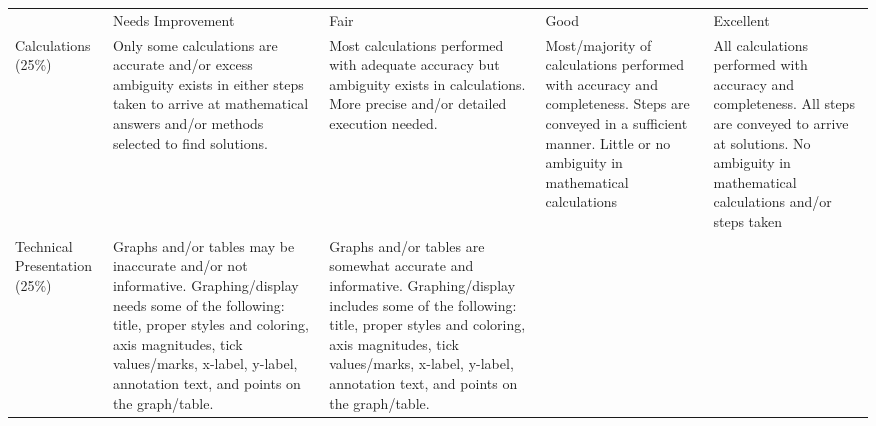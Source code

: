 \documentclass[letterpaper,12pt]{article}
\begin{document}

\begin{landscape}
\begin{footnotesize}
\renewcommand{\arraystretch}{2}
\nopagebreak[6]
	\vspace*{-20mm}
\begin{longtable}{| >{\RaggedRight}p{} | >{\RaggedRight}p{} | >{\RaggedRight}p{} | >{\RaggedRight}p{} | >{\RaggedRight}p{} |} 
   \multicolumn{5}{@{}l}{\bf Presentation Rubric} \\\bottomrule
   &\centering Needs Improvement       &\centering  Fair &          Good       &          Excellent \\\hline
Calculations (25\%) 
   & Only some calculations are accurate and/or excess ambiguity exists in either steps taken to arrive at mathematical answers and/or methods selected to find solutions. 
   & Most calculations performed with adequate accuracy but ambiguity exists in calculations. More precise and/or detailed execution needed. 
   & Most/majority of calculations performed with accuracy and completeness. Steps are conveyed in a sufficient manner. Little or no ambiguity in mathematical calculations
   & All calculations performed with accuracy and completeness. All steps are conveyed to arrive at solutions. No ambiguity in mathematical calculations and/or steps taken
\\\hline
Technical Presentation (25\%)        
   & Graphs and/or tables may be inaccurate and/or not informative. Graphing/display needs some of the following: title, proper styles and coloring, axis magnitudes, tick values/marks, x-label, y-label, annotation text, and points on the graph/table. 
   & Graphs and/or tables are somewhat accurate and informative. Graphing/display includes some of the following: title, proper styles and coloring, axis magnitudes, tick values/marks, x-label, y-label, annotation text, and points on the graph/table.

\end{longtable}
\end{footnotesize}
\end{landscape}
\end{document}

